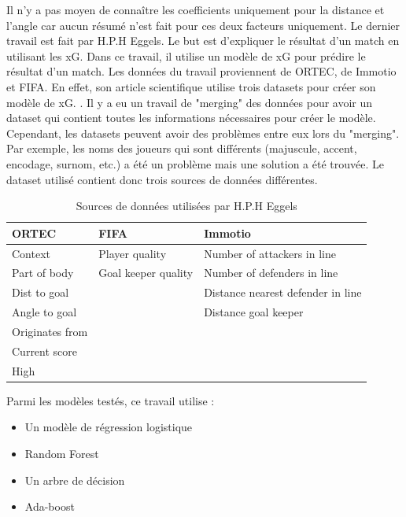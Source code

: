 \documentclass[12pt]{article}
\begin{document}
Il n'y a pas moyen de connaître les coefficients uniquement pour la distance et l'angle car aucun résumé n'est fait pour ces deux facteurs uniquement.
\newline\newline
Le dernier travail est fait par H.P.H Eggels. 
Le but est d'expliquer le résultat d'un match en utilisant les xG. 
Dans ce travail, il utilise un modèle de xG pour prédire le résultat d'un match.
Les données du travail proviennent de ORTEC, de Immotio et FIFA. En effet, son article scientifique utilise trois datasets pour créer son modèle de xG. \cite{eggelsExpectedGoalsSoccer2016}.
Il y a eu un travail de "merging" des données pour avoir un dataset qui contient toutes les informations nécessaires pour créer le modèle. 
Cependant, les datasets peuvent avoir des problèmes entre eux lors du "merging". 
Par exemple, les noms des joueurs qui sont différents (majuscule, accent, encodage, surnom, etc.) a été un problème mais une solution a été trouvée.
\newline
Le dataset utilisé contient donc trois sources de données différentes.
\begin{table}[htp]
    \centering
    \begin{tabular}{lll}
    \hline
    \textbf{ORTEC}  & \textbf{FIFA}       & \textbf{Immotio}                  \\ \hline
    Context         & Player quality      & Number of attackers in line       \\
    Part of body    & Goal keeper quality & Number of defenders in line       \\
    Dist to goal    &                     & Distance nearest defender in line \\
    Angle to goal   &                     & Distance goal keeper              \\
    Originates from &                     &                                   \\
    Current score   &                     &                                   \\
    High            &                     &                                   \\ \hline
    \end{tabular}
    \caption{Sources de données utilisées par H.P.H Eggels}
\end{table}
\newpage
Parmi les modèles testés, ce travail utilise :
\begin{itemize}
    \item Un modèle de régression logistique
    \item Random Forest
    \item Un arbre de décision
    \item Ada-boost
\end{itemize}
\end{document}
